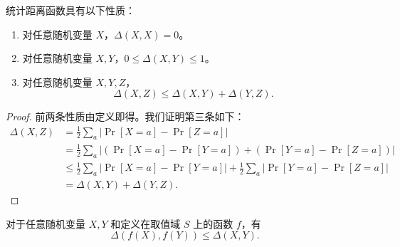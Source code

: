 \documentclass[american,singlepageview]{snargs-book-zh}
\newcommand{\RandomVariableX}{X}
\newcommand{\RandomVariableY}{Y}
\newcommand{\RandomVariableZ}{Z}
\newcommand{\RandomVariableSupport}{S}
\newcommand{\StatisticalDistanceSymbol}{\Delta}
\newcommand{\StatisticalDistance}[2]{\StatisticalDistanceSymbol\left(#1,#2\right)}
\newcommand{\AbsValue}[1]{\left|{#1}\right|}
\begin{document}
\begin{claim}
\label{claim:triangle-inequality-statistical-distance}
统计距离函数具有以下性质：
\begin{enumerate}[noitemsep]
  \item 对任意随机变量 $\RandomVariableX$，$\StatisticalDistance{\RandomVariableX}{\RandomVariableX}=0$。
  \item 对任意随机变量 $\RandomVariableX,\RandomVariableY$，$0 \leq \StatisticalDistance{\RandomVariableX}{\RandomVariableY} \leq 1$。
  \item 对任意随机变量 $\RandomVariableX,\RandomVariableY,\RandomVariableZ$，
  \[
    \StatisticalDistance{\RandomVariableX}{\RandomVariableZ}
    \leq
    \StatisticalDistance{\RandomVariableX}{\RandomVariableY}
    +
    \StatisticalDistance{\RandomVariableY}{\RandomVariableZ}.
  \]
\end{enumerate}
\end{claim}

\begin{proof}
前两条性质由定义即得。我们证明第三条如下：
\begin{align*}
\StatisticalDistance{\RandomVariableX}{\RandomVariableZ}
&=
\frac{1}{2} \sum_{a} \AbsValue{\Pr[\RandomVariableX=a]-\Pr[\RandomVariableZ=a]}
\\ &=
\frac{1}{2} \sum_{a} \AbsValue{(\Pr[\RandomVariableX=a]-\Pr[\RandomVariableY=a]) + (\Pr[\RandomVariableY=a]-\Pr[\RandomVariableZ=a])}
\\ &\leq
\frac{1}{2} \sum_{a} \AbsValue{\Pr[\RandomVariableX=a]-\Pr[\RandomVariableY=a]}
+
\frac{1}{2} \sum_{a} \AbsValue{\Pr[\RandomVariableY=a]-\Pr[\RandomVariableZ=a]}
\\ &=
\StatisticalDistance{\RandomVariableX}{\RandomVariableY}
+
\StatisticalDistance{\RandomVariableY}{\RandomVariableZ}.
\end{align*}
\end{proof}

\begin{claim}
\label{claim:function-and-statistical-distance}
对于任意随机变量 $\RandomVariableX,\RandomVariableY$ 和定义在取值域 $\RandomVariableSupport$ 上的函数 $f$，有
\[
\StatisticalDistance{f(\RandomVariableX)}{f(\RandomVariableY)}
\leq
\StatisticalDistance{\RandomVariableX}{\RandomVariableY}.
\]
\end{claim}
\end{document}
